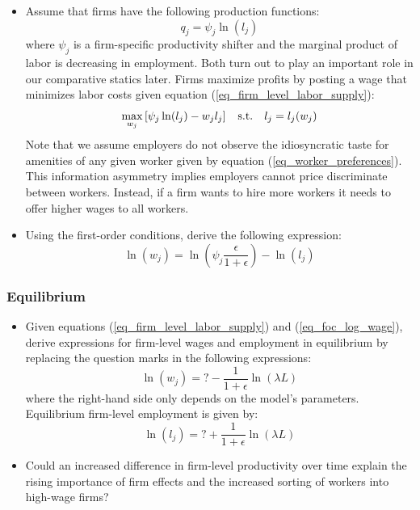 \documentclass[a4paper,12pt]{article}
\begin{document}
\begin{itemize}

\item Assume that firms have the following production functions:
\begin{equation}
    q_{j} = \psi_{j} \ln(l_{j})
\end{equation}
where $\psi_{j}$ is a firm-specific productivity shifter and the marginal product of labor is decreasing in employment. Both turn out to play an important role in our comparative statics later. Firms maximize profits by posting a wage that minimizes labor costs given equation (\ref{eq_firm_level_labor_supply}):
\begin{equation}
    \max_{w_{j}} \left[ \psi_{j} \ln(l_{j}) - w_{j} l_{j} \right] \text{\hspace{0.2cm} s.t. \hspace{0.2cm}} l_{j}=l_{j}(w_{j})
\end{equation}
Note that we assume employers do not observe the idiosyncratic taste for amenities of any given worker given by equation (\ref{eq_worker_preferences}). This information asymmetry implies employers cannot price discriminate between workers. Instead, if a firm wants to hire more workers it needs to offer higher wages to all workers.

\item Using the first-order conditions, derive the following expression:
\begin{equation} \label{eq_foc_log_wage}
   \ln(w_{j}) = \ln \left( \psi_{j} \frac{\epsilon}{1+ \epsilon} \right) - \ln(l_{j})
\end{equation}

\end{itemize}

\subsubsection{Equilibrium}

\begin{itemize}

\item Given equations (\ref{eq_firm_level_labor_supply}) and (\ref{eq_foc_log_wage}), derive expressions for firm-level wages and employment in equilibrium by replacing the question marks in the following expressions:
\begin{equation} \label{eq_log_wage}
   \ln(w_{j}) = \textbf{?} - \frac{1 }{1+ \epsilon} \ln(\lambda L)
\end{equation}
where the right-hand side only depends on the model's parameters. Equilibrium firm-level employment is given by:
\begin{equation} \label{eq_log_employment}
   \ln(l_{j}) = \textbf{?} + \frac{1}{1+ \epsilon} \ln(\lambda L)
\end{equation}

\item Could an increased difference in firm-level productivity over time explain the rising importance of firm effects and the increased sorting of workers into high-wage firms?

\end{itemize}
\end{document}
